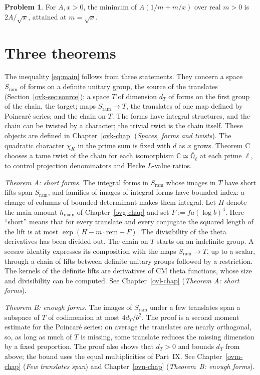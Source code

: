 \documentclass[reqno]{amsart}
\newcounter{chap}
\theoremstyle{definition}
\newtheorem{problem}{Problem}[section]
\newcommand{\rem}{\mathrm{rem}}
\newcommand{\Q}{\mathbb{Q}}
\begin{document}
\begin{problem}\label{pr:sqrt}
  For \(A, x > 0\), the minimum of \(A (1/m + m/x)\) over real
  \(m > 0\) is \(2A/\sqrt{x}\), attained at \(m = \sqrt{x}\).
\end{problem}

\section{Three theorems}\label{sec:theorems}

The inequality \eqref{eq:main} follows from three statements.  They
concern a space \(S_{\mathrm{ram}}\) of forms on a definite unitary
group, the source of the translates (Section~\ref{ovk-sec:source}); a space \(T\) of dimension \(d_T\) of forms on
the first group of the chain, the target; maps
\(S_{\mathrm{ram}} \to T\), the translates of one map defined by
Poincar\'e series; and the chain on \(T\).  The forms have integral
structures, and the chain can be twisted by a character; the
trivial twist is the chain itself.  These objects are defined in
Chapter~\ref{ovk-chap} (\emph{Spaces, forms and twists}).
The quadratic character \(\chi_K\) in the prime sum is fixed with
\(d\) as \(x\) grows.  Theorem C chooses a tame twist of the chain
for each isomorphism \(\mathbb{C} \simeq \overline{\Q}_\ell\) at
each prime \(\ell\), to control projection denominators and Hecke
\(L\)-value ratios.

\emph{Theorem A: short forms.}  The integral forms in
\(S_{\mathrm{ram}}\) whose images in \(T\) have short lifts span
\(S_{\mathrm{ram}}\), and families of images of integral forms have
bounded index: a change of columns of bounded determinant makes
them integral.  Let \(H\) denote the main amount \(h_{\mathrm{main}}\)
of Chapter~\ref{ovg-chap} and set \(F := f a (\log b)^4\).  Here ``short''
means that for every translate and every conjugate the squared length of
the lift is at most \(\exp(H - m \cdot \rem + F)\).  The divisibility of
the theta derivatives has been divided out.  The
chain on \(T\) starts on an indefinite group.  A seesaw identity
expresses its composition with the maps \(S_{\mathrm{ram}} \to T\),
up to a scalar, through a chain of lifts between definite unitary
groups followed by a restriction.  The kernels of the definite
lifts are derivatives of CM theta functions, whose size and
divisibility can be computed.  See Chapter~\ref{ovl-chap} (\emph{Theorem A: short forms}).

\emph{Theorem B: enough forms.}  The images of \(S_{\mathrm{ram}}\)
under a few translates span a subspace of \(T\) of codimension at
most \(4 d_T/b^2\).  The proof is a second moment estimate for the
Poincar\'e series: on average the translates are nearly
orthogonal, so, as long as much of \(T\) is missing, some translate
reduces the missing dimension by a fixed proportion.  The proof
also shows that \(d_T > 0\) and bounds \(d_T\) from above; the
bound uses the equal multiplicities of Part~IX.  See
Chapter~\ref{ovm-chap} (\emph{Few translates span}) and
Chapter~\ref{ovn-chap} (\emph{Theorem~B: enough forms}).
\end{document}
